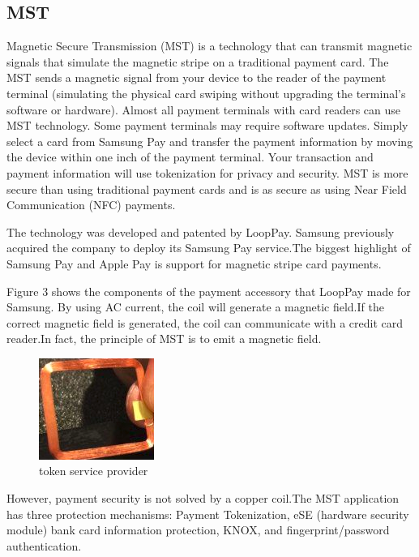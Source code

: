 \documentclass[journal]{IEEEtran}
\begin{document}
\subsection{MST}
Magnetic Secure Transmission (MST) is a technology that can transmit magnetic signals that simulate the magnetic stripe on a traditional payment card. The MST sends a magnetic signal from your device to the reader of the payment terminal (simulating the physical card swiping without upgrading the terminal's software or hardware). Almost all payment terminals with card readers can use MST technology. Some payment terminals may require software updates. Simply select a card from Samsung Pay and transfer the payment information by moving the device within one inch of the payment terminal. Your transaction and payment information will use tokenization for privacy and security. MST is more secure than using traditional payment cards and is as secure as using Near Field Communication (NFC) payments.

The technology was developed and patented by LoopPay. Samsung previously acquired the company to deploy its Samsung Pay service.The biggest highlight of Samsung Pay and Apple Pay is support for magnetic stripe card payments.

Figure 3 shows the components of the payment accessory that LoopPay made for Samsung. By using AC current, the coil will generate a magnetic field.If the correct magnetic field is generated, the coil can communicate with a credit card reader.In fact, the principle of MST is to emit a magnetic field.

\begin{figure}[htbp]
\centerline{\includegraphics[scale=1]{MSTyuanjian2.png}}
\caption{token service provider}
\label{fig}
\end{figure}

However, payment security is not solved by a copper coil.The MST application has three protection mechanisms: Payment Tokenization, eSE (hardware security module) bank card information protection, KNOX, and fingerprint/password authentication.
\end{document}
